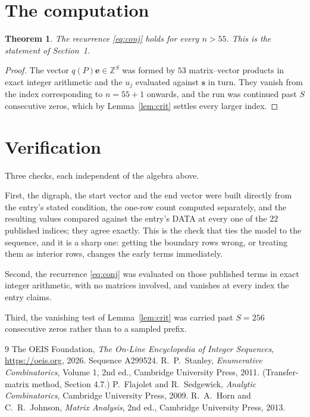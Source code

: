 \documentclass[11pt,a4paper]{article}
\theoremstyle{plain}
\newtheorem{theorem}{Theorem}
\theoremstyle{definition}
\begin{document}
\section{The computation}

\begin{theorem}
The recurrence \eqref{eq:conj} holds for every $n>55$. This is the statement of
Section~1.
\end{theorem}

\begin{proof}
The vector $q(P)\mathbf{e}\in\mathbb{Z}^{S}$ was formed by $53$ matrix--vector
products in exact integer arithmetic and the $u_j$ evaluated against $\mathbf{s}$ in turn.
They vanish from the index corresponding to $n=55+1$ onwards, and the run was continued
past $S$ consecutive zeros, which by Lemma~\ref{lem:crit} settles every larger index.
\end{proof}

\section{Verification}

Three checks, each independent of the algebra above.

First, the digraph, the start vector and the end vector were built directly from the
entry's stated condition, the one-row count computed separately, and the resulting values
compared against the entry's DATA at every one of the $22$ published indices; they
agree exactly. This is the check that ties the model to the sequence, and it is a sharp one:
getting the boundary rows wrong, or treating them as interior rows, changes the early terms
immediately.

Second, the recurrence \eqref{eq:conj} was evaluated on those published terms in exact
integer arithmetic, with no matrices involved, and vanishes at every index the entry claims.

Third, the vanishing test of Lemma~\ref{lem:crit} was carried past $S=256$ consecutive
zeros rather than to a sampled prefix.

\begin{thebibliography}{9}
 The OEIS Foundation, \emph{The On-Line Encyclopedia of Integer
Sequences}, \url{https://oeis.org}, 2026. Sequence A299524.
 R.~P.~Stanley, \emph{Enumerative Combinatorics}, Volume 1, 2nd ed.,
Cambridge University Press, 2011. (Transfer-matrix method, Section 4.7.)
 P.~Flajolet and R.~Sedgewick, \emph{Analytic Combinatorics}, Cambridge
University Press, 2009.
 R.~A.~Horn and C.~R.~Johnson, \emph{Matrix Analysis}, 2nd ed., Cambridge
University Press, 2013.
\end{thebibliography}
\end{document}
